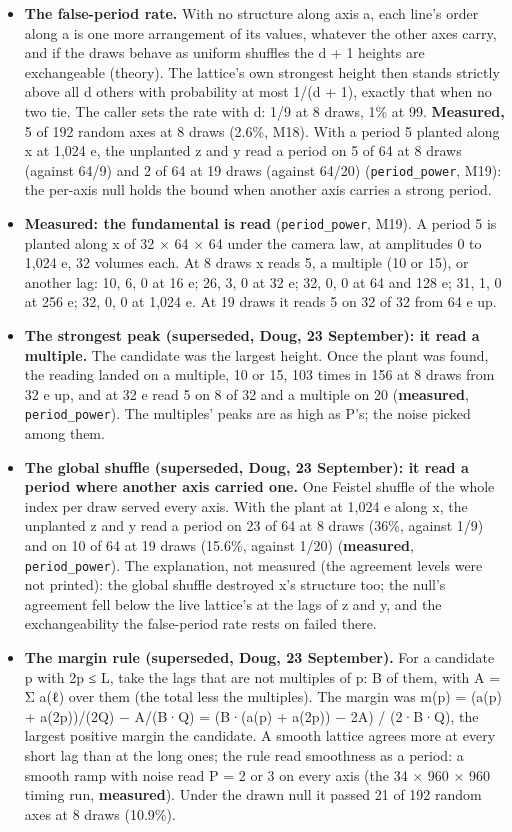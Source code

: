 \begin{itemize}
\item \textbf{The false-period rate.} With no structure along axis a, each line's order along a is one more arrangement of its values, whatever the other axes carry, and if the draws behave as uniform shuffles the d + 1 heights are exchangeable (theory). The lattice's own strongest height then stands strictly above all d others with probability at most 1/(d + 1), exactly that when no two tie. The caller sets the rate with d: 1/9 at 8 draws, 1\% at 99. \textbf{Measured,} 5 of 192 random axes at 8 draws (2.6\%, M18). With a period 5 planted along x at 1,024 e, the unplanted z and y read a period on 5 of 64 at 8 draws (against 64/9) and 2 of 64 at 19 draws (against 64/20) (\texttt{period\_\allowbreak{}power}, M19): the per-axis null holds the bound when another axis carries a strong period.
\item \textbf{Measured: the fundamental is read} (\texttt{period\_\allowbreak{}power}, M19). A period 5 is planted along x of 32 × 64 × 64 under the camera law, at amplitudes 0 to 1,024 e, 32 volumes each. At 8 draws x reads 5, a multiple (10 or 15), or another lag: 10, 6, 0 at 16 e; 26, 3, 0 at 32 e; 32, 0, 0 at 64 and 128 e; 31, 1, 0 at 256 e; 32, 0, 0 at 1,024 e. At 19 draws it reads 5 on 32 of 32 from 64 e up.
\item \textbf{The strongest peak (superseded, Doug, 23 September): it read a multiple.} The candidate was the largest height. Once the plant was found, the reading landed on a multiple, 10 or 15, 103 times in 156 at 8 draws from 32 e up, and at 32 e read 5 on 8 of 32 and a multiple on 20 (\textbf{measured}, \texttt{period\_\allowbreak{}power}). The multiples' peaks are as high as P's; the noise picked among them.
\item \textbf{The global shuffle (superseded, Doug, 23 September): it read a period where another axis carried one.} One Feistel shuffle of the whole index per draw served every axis. With the plant at 1,024 e along x, the unplanted z and y read a period on 23 of 64 at 8 draws (36\%, against 1/9) and on 10 of 64 at 19 draws (15.6\%, against 1/20) (\textbf{measured}, \texttt{period\_\allowbreak{}power}). The explanation, not measured (the agreement levels were not printed): the global shuffle destroyed x's structure too; the null's agreement fell below the live lattice's at the lags of z and y, and the exchangeability the false-period rate rests on failed there.
\item \textbf{The margin rule (superseded, Doug, 23 September).} For a candidate p with 2p ≤ L, take the lags that are not multiples of p: B of them, with A = Σ a(ℓ) over them (the total less the multiples). The margin was m(p) = (a(p) + a(2p))/(2Q) − A/(B·Q) = (B·(a(p) + a(2p)) − 2A) / (2·B·Q), the largest positive margin the candidate. A smooth lattice agrees more at every short lag than at the long ones; the rule read smoothness as a period: a smooth ramp with noise read P = 2 or 3 on every axis (the 34 × 960 × 960 timing run, \textbf{measured}). Under the drawn null it passed 21 of 192 random axes at 8 draws (10.9\%).

\end{itemize}
